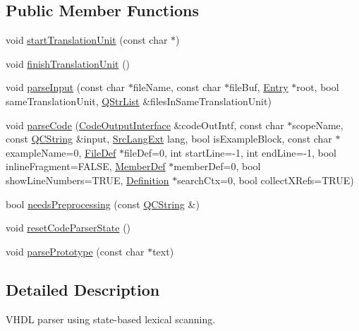 \subsection*{Public Member Functions}
\begin{DoxyCompactItemize}
\item 
void \mbox{\hyperlink{class_v_h_d_l_language_scanner_a57e38f82bcb0ab8af7d6dabe131ad394}{start\+Translation\+Unit}} (const char $\ast$)
\item 
void \mbox{\hyperlink{class_v_h_d_l_language_scanner_a1c08cc94a1cd79fdaf8a102935089445}{finish\+Translation\+Unit}} ()
\item 
void \mbox{\hyperlink{class_v_h_d_l_language_scanner_a604cae09257525fbca32c10ffeb6e961}{parse\+Input}} (const char $\ast$file\+Name, const char $\ast$file\+Buf, \mbox{\hyperlink{class_entry}{Entry}} $\ast$root, bool same\+Translation\+Unit, \mbox{\hyperlink{class_q_str_list}{Q\+Str\+List}} \&files\+In\+Same\+Translation\+Unit)
\item 
void \mbox{\hyperlink{class_v_h_d_l_language_scanner_a50e725c43fa209d4caad04c214bbb1f2}{parse\+Code}} (\mbox{\hyperlink{class_code_output_interface}{Code\+Output\+Interface}} \&code\+Out\+Intf, const char $\ast$scope\+Name, const \mbox{\hyperlink{class_q_c_string}{Q\+C\+String}} \&input, \mbox{\hyperlink{types_8h_a9974623ce72fc23df5d64426b9178bf2}{Src\+Lang\+Ext}} lang, bool is\+Example\+Block, const char $\ast$example\+Name=0, \mbox{\hyperlink{class_file_def}{File\+Def}} $\ast$file\+Def=0, int start\+Line=-\/1, int end\+Line=-\/1, bool inline\+Fragment=F\+A\+L\+SE, \mbox{\hyperlink{class_member_def}{Member\+Def}} $\ast$member\+Def=0, bool show\+Line\+Numbers=T\+R\+UE, \mbox{\hyperlink{class_definition}{Definition}} $\ast$search\+Ctx=0, bool collect\+X\+Refs=T\+R\+UE)
\item 
bool \mbox{\hyperlink{class_v_h_d_l_language_scanner_ae36ed4aad0a9dc9beed5afa3e831a5ee}{needs\+Preprocessing}} (const \mbox{\hyperlink{class_q_c_string}{Q\+C\+String}} \&)
\item 
void \mbox{\hyperlink{class_v_h_d_l_language_scanner_a67461c7de314e7f414fb70d5735727c3}{reset\+Code\+Parser\+State}} ()
\item 
void \mbox{\hyperlink{class_v_h_d_l_language_scanner_a10bbe28441f011a5de49705e1a64db00}{parse\+Prototype}} (const char $\ast$text)
\end{DoxyCompactItemize}


\subsection{Detailed Description}
V\+H\+DL parser using state-\/based lexical scanning. 

